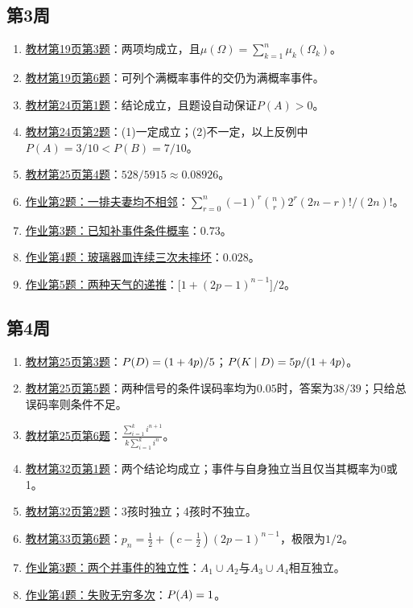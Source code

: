 \subsection*{第3周}
\begin{enumerate}
\item \hyperref[ex:w03-t3]{教材第19页第3题}：两项均成立，且$\mu(\Omega)=\sum_{k=1}^n\mu_k(\Omega_k)$。
\item \hyperref[ex:w03-t6]{教材第19页第6题}：可列个满概率事件的交仍为满概率事件。
\item \hyperref[ex:w03-t241]{教材第24页第1题}：结论成立，且题设自动保证$P(A)>0$。
\item \hyperref[ex:w03-t242]{教材第24页第2题}：(1)一定成立；(2)不一定，以上反例中$P(A)=3/10<P(B)=7/10$。
\item \hyperref[ex:w03-t254]{教材第25页第4题}：$528/5915\approx0.08926$。
\item \hyperref[ex:w03-h2]{作业第2题：一排夫妻均不相邻}：$\displaystyle\sum_{r=0}^n(-1)^r\binom nr2^r(2n-r)!/(2n)!$。
\item \hyperref[ex:w03-h3]{作业第3题：已知补事件条件概率}：$0.73$。
\item \hyperref[ex:w03-h4]{作业第4题：玻璃器皿连续三次未摔坏}：$0.028$。
\item \hyperref[ex:w03-h5]{作业第5题：两种天气的递推}：$\bigl[1+(2p-1)^{n-1}\bigr]/2$。
\end{enumerate}
\subsection*{第4周}
\begin{enumerate}
\item \hyperref[ex:w04-t25-3]{教材第25页第3题}：$\P(D)=(1+4p)/5$；$\P(K\mid D)=5p/(1+4p)$。
\item \hyperref[ex:w04-t25-5]{教材第25页第5题}：两种信号的条件误码率均为$0.05$时，答案为$38/39$；只给总误码率则条件不足。
\item \hyperref[ex:w04-t25-6]{教材第25页第6题}：$\displaystyle\frac{\sum_{i=1}^ki^{n+1}}{k\sum_{i=1}^ki^n}$。
\item \hyperref[ex:w04-t32-1]{教材第32页第1题}：两个结论均成立；事件与自身独立当且仅当其概率为0或1。
\item \hyperref[ex:w04-t32-2]{教材第32页第2题}：3孩时独立；4孩时不独立。
\item \hyperref[ex:w04-t33-6]{教材第33页第6题}：$p_n=\frac12+(c-\frac12)(2p-1)^{n-1}$，极限为$1/2$。
\item \hyperref[ex:w04-h3]{作业第3题：两个并事件的独立性}：$A_1\cup A_2$与$A_3\cup A_4$相互独立。
\item \hyperref[ex:w04-h4]{作业第4题：失败无穷多次}：$\P(A)=1$。
\end{enumerate}
